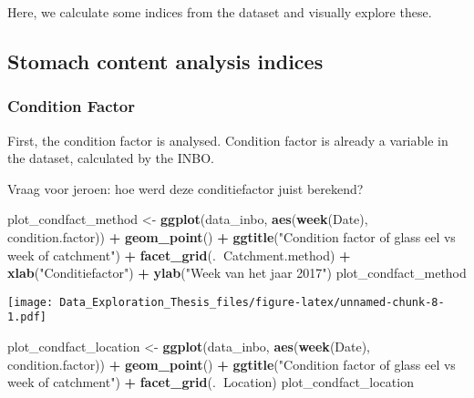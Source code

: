 \documentclass[]{article}
\newenvironment{Shaded}{\begin{snugshade}}{\end{snugshade}}
\newcommand{\KeywordTok}[1]{\textcolor[rgb]{0.13,0.29,0.53}{\textbf{#1}}}
\newcommand{\StringTok}[1]{\textcolor[rgb]{0.31,0.60,0.02}{#1}}
\newcommand{\OperatorTok}[1]{\textcolor[rgb]{0.81,0.36,0.00}{\textbf{#1}}}
\newcommand{\NormalTok}[1]{#1}
\begin{document}
Here, we calculate some indices from the dataset and visually explore
these.

\subsection{Stomach content analysis
indices}\label{stomach-content-analysis-indices}

\subsubsection{Condition Factor}\label{condition-factor}

First, the condition factor is analysed. Condition factor is already a
variable in the dataset, calculated by the INBO.

Vraag voor jeroen: hoe werd deze conditiefactor juist berekend?

\begin{Shaded}
\begin{Highlighting}[]
\NormalTok{plot_condfact_method <-}\StringTok{ }\KeywordTok{ggplot}\NormalTok{(data_inbo, }\KeywordTok{aes}\NormalTok{(}\KeywordTok{week}\NormalTok{(Date), condition.factor)) }\OperatorTok{+}
\StringTok{  }\KeywordTok{geom_point}\NormalTok{() }\OperatorTok{+}
\StringTok{  }\KeywordTok{ggtitle}\NormalTok{(}\StringTok{"Condition factor of glass eel vs week of catchment"}\NormalTok{) }\OperatorTok{+}
\StringTok{  }\KeywordTok{facet_grid}\NormalTok{(.}\OperatorTok{~}\NormalTok{Catchment.method) }\OperatorTok{+}
\StringTok{  }\KeywordTok{xlab}\NormalTok{(}\StringTok{"Conditiefactor"}\NormalTok{) }\OperatorTok{+}
\StringTok{  }\KeywordTok{ylab}\NormalTok{(}\StringTok{"Week van het jaar 2017"}\NormalTok{)}
\NormalTok{plot_condfact_method}
\end{Highlighting}
\end{Shaded}

\texttt{[image: Data\_Exploration\_Thesis\_files/figure-latex/unnamed-chunk-8-1.pdf]}

\begin{Shaded}
\begin{Highlighting}[]
\NormalTok{plot_condfact_location <-}\StringTok{ }\KeywordTok{ggplot}\NormalTok{(data_inbo, }\KeywordTok{aes}\NormalTok{(}\KeywordTok{week}\NormalTok{(Date), condition.factor)) }\OperatorTok{+}
\StringTok{  }\KeywordTok{geom_point}\NormalTok{() }\OperatorTok{+}
\StringTok{  }\KeywordTok{ggtitle}\NormalTok{(}\StringTok{"Condition factor of glass eel vs week of catchment"}\NormalTok{) }\OperatorTok{+}
\StringTok{  }\KeywordTok{facet_grid}\NormalTok{(.}\OperatorTok{~}\NormalTok{Location)}
\NormalTok{plot_condfact_location}
\end{Highlighting}
\end{Shaded}
\end{document}

